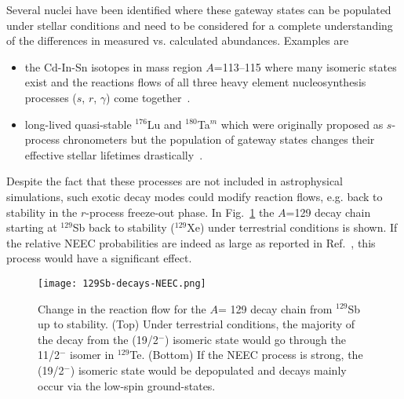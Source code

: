 \documentclass[jon_ringuette_thesis_proposal.tex]{subfiles}
\begin{document}
    Several nuclei have been identified where these gateway states can be populated under stellar conditions and need to be considered for a complete understanding of the differences in measured vs. calculated abundances.
    Examples are
    \begin{itemize}
        \item the Cd-In-Sn isotopes in mass region $A$=113--115 where many isomeric states exist and the reactions flows of all three heavy element nucleosynthesis processes ($s$, $r$, $\gamma$) come together~\cite{Nem94}.
        \vspace{-10pt}
        \item long-lived quasi-stable $^{176}$Lu and $^{180}$Ta$^m$ which were originally proposed as $s$-process chronometers but the population of gateway states changes their effective stellar lifetimes drastically~\cite{Car89}.
    \end{itemize}



    Despite the fact that these processes are not included in astrophysical simulations, such exotic decay modes could modify reaction flows, e.g. back to stability in the $r$-process freeze-out phase.
    In Fig.~\ref{A129-decay} the $A$=129 decay chain starting at $^{129}$Sb back to stability ($^{129}$Xe) under terrestrial conditions is shown.
    If the relative NEEC probabilities are indeed as large as reported in Ref.~\cite{Chiara2018}, this process would have a significant effect.

    \begin{figure}[H]
        \centering
        \texttt{[image: 129Sb-decays-NEEC.png]}
        \caption{\label{A129-decay}\small{Change in the reaction flow for the $A$= 129 decay chain from $^{129}$Sb up to stability. (Top) Under terrestrial conditions, the majority of the decay from the (19/2$^-$) isomeric state would go through the 11/2$^-$ isomer in $^{129}$Te. (Bottom) If the NEEC process is strong, the (19/2$^-$) isomeric state would be depopulated and decays mainly occur via the low-spin ground-states.} \cite{eec_SOP_NEEC}}
    \end{figure}
\end{document}
